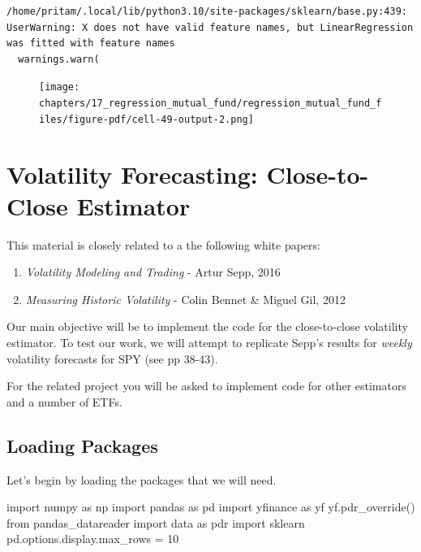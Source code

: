 \documentclass[
  letterpaper,
  DIV=11,
  numbers=noendperiod]{scrreprt}
\newenvironment{Shaded}{\begin{snugshade}}{\end{snugshade}}
\newcommand{\DecValTok}[1]{\textcolor[rgb]{0.68,0.00,0.00}{#1}}
\newcommand{\ImportTok}[1]{\textcolor[rgb]{0.00,0.46,0.62}{#1}}
\newcommand{\NormalTok}[1]{\textcolor[rgb]{0.00,0.23,0.31}{#1}}
\newcommand{\OperatorTok}[1]{\textcolor[rgb]{0.37,0.37,0.37}{#1}}
\begin{document}
\begin{verbatim}
/home/pritam/.local/lib/python3.10/site-packages/sklearn/base.py:439: UserWarning: X does not have valid feature names, but LinearRegression was fitted with feature names
  warnings.warn(
\end{verbatim}

\begin{figure}[H]

{\centering \texttt{[image: chapters/17\_regression\_mutual\_fund/regression\_mutual\_fund\_files/figure-pdf/cell-49-output-2.png]}

}

\end{figure}

\hypertarget{volatility-forecasting-close-to-close-estimator}{%
\chapter{Volatility Forecasting: Close-to-Close
Estimator}\label{volatility-forecasting-close-to-close-estimator}}

This material is closely related to a the following white papers:

\begin{enumerate}
\def\labelenumi{\arabic{enumi}.}
\item
  \emph{Volatility Modeling and Trading} - Artur Sepp, 2016
\item
  \emph{Measuring Historic Volatility} - Colin Bennet \& Miguel Gil,
  2012
\end{enumerate}

Our main objective will be to implement the code for the close-to-close
volatility estimator. To test our work, we will attempt to replicate
Sepp's results for \emph{weekly} volatility forecasts for SPY (see pp
38-43).

For the related project you will be asked to implement code for other
estimators and a number of ETFs.

\hypertarget{loading-packages-8}{%
\section{Loading Packages}\label{loading-packages-8}}

Let's begin by loading the packages that we will need.

\begin{Shaded}
\begin{Highlighting}[]
\ImportTok{import}\NormalTok{ numpy }\ImportTok{as}\NormalTok{ np}
\ImportTok{import}\NormalTok{ pandas }\ImportTok{as}\NormalTok{ pd}
\ImportTok{import}\NormalTok{ yfinance }\ImportTok{as}\NormalTok{ yf}
\NormalTok{yf.pdr\_override()}
\ImportTok{from}\NormalTok{ pandas\_datareader }\ImportTok{import}\NormalTok{ data }\ImportTok{as}\NormalTok{ pdr}
\ImportTok{import}\NormalTok{ sklearn}
\NormalTok{pd.options.display.max\_rows }\OperatorTok{=} \DecValTok{10}
\end{Highlighting}
\end{Shaded}
\end{document}
